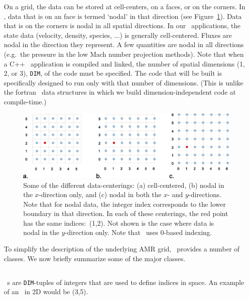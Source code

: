 On a grid, the data can be stored at cell-centers, on a faces, or
on the corners.  In \BoxLib, data that is on an face is termed `nodal'
in that direction (see Figure~\ref{fig:dataloc}).  Data that is on the
corners is nodal in all spatial directions.  In our \BoxLib\ applications, 
the state data (velocity, density, species, $\ldots$) is generally
cell-centered.  Fluxes are nodal in the direction they represent.
A few quantities are nodal in all directions (e.g.\ the pressure in
the low Mach number projection methods).  
Note that when a C++ \BoxLib\ application is compiled and linked,
the number of spatial dimensions (1, 2, or 3), {\tt DIM},
of the code must be specified.  The code that will be
built is specifically designed to run only with that number of dimensions.
(This is unlike the fortran \BoxLib\ data structures in which we build
dimension-independent code at compile-time.)
\begin{figure}[h]
\centering
\includegraphics[width=6.5in]{./Overview/data_loc2}
\caption{\label{fig:dataloc} Some of the different data-centerings:
(a) cell-centered, (b) nodal in the $x$-direction only, and (c) nodal in
both the $x$- and $y$-directions.  Note that for nodal data, the
integer index corresponds to the lower boundary in that direction.
In each of these centerings, the red point has the same indices:\ (1,2).
Not shown is the case where data is nodal in the $y$-direction only.  
Note that \BoxLib\ uses $0$-based indexing.}
\end{figure}

To simplify the description of the underlying AMR grid, \BoxLib\
provides a number of classes.  We now briefly summarize some of the major
classes.

\subsection{\IntVect}

\IntVect~s are {\tt DIM}-tuples of integers that are used to define
indices in space.  An example of an \IntVect\ in 2D would
be (3,5).

